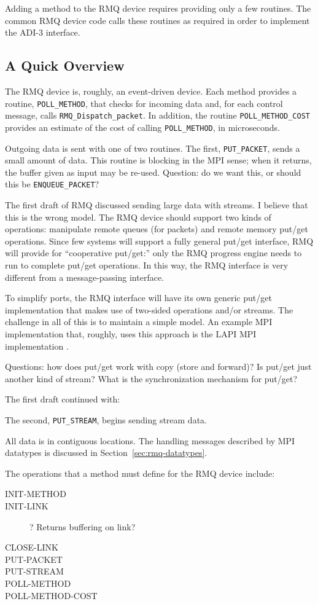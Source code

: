 \documentclass{article}
\let\code=\texttt
\begin{document}
Adding a method to the RMQ device requires providing only a few routines.  The
common RMQ device code calls these routines as required in order to implement
the ADI-3 interface.  

\subsection{A Quick Overview}
The RMQ device is, roughly, an event-driven device.  Each method provides a
routine, \code{POLL\_METHOD}, that checks for incoming data and, for each
control message, calls \code{RMQ\_Dispatch\_packet}.  In addition, the routine
\code{POLL\_METHOD\_COST} provides an estimate of the cost of calling
\code{POLL\_METHOD}, in microseconds.  

Outgoing data is sent with one of two routines.  The first, \code{PUT\_PACKET},
sends a small amount of data.  
This routine is blocking in the MPI sense; when
it returns, the buffer given as input may be re-used. Question: do we want
this, or should this be \code{ENQUEUE\_PACKET}?

The first draft of RMQ discussed sending large data with streams.  I believe
that this is the wrong model.  The RMQ device should support two kinds of
operations: manipulate remote queues (for packets) and remote memory put/get
operations.  Since few systems will support a fully general put/get interface,
RMQ will provide for ``cooperative put/get:'' only the RMQ progress engine
needs to run to complete put/get operations.  In this way, the RMQ interface
is very different from a message-passing interface.

To simplify ports, the RMQ interface will have its own generic put/get
implementation that makes use of two-sided operations and/or streams.  The
challenge in all of this is to maintain a simple model.  An example MPI
implementation that, roughly, uses this approach is the LAPI MPI
implementation \cite{lapi-mpich}.

Questions: how does put/get work with copy (store and forward)?  Is put/get
just another kind of stream?  What is the synchronization mechanism for
put/get?  

The first draft continued with:

The second, \code{PUT\_STREAM}, begins sending stream data.

All data is in contiguous locations.  The handling messages described by MPI
datatypes is discussed in Section~\ref{sec:rmq-datatypes}.

The operations that a method must define for the RMQ device include:
\begin{description}
\item[INIT-METHOD]
\item[INIT-LINK]? Returns buffering on link?
\item[CLOSE-LINK]
\item[PUT-PACKET]
\item[PUT-STREAM]
\item[POLL-METHOD]
\item[POLL-METHOD-COST]
\end{description}
\end{document}
